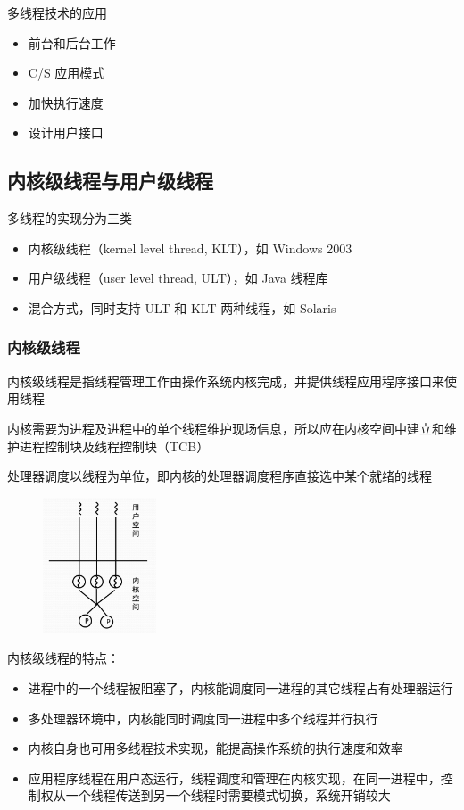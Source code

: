 \documentclass[cs4size,a4paper,10pt]{ctexart}
\begin{document}
	多线程技术的应用
	\begin{itemize}
		\item 前台和后台工作
		\item C/S 应用模式
		\item 加快执行速度
		\item 设计用户接口
	\end{itemize}


	\subsection{内核级线程与用户级线程}
	多线程的实现分为三类
	\begin{itemize}
		\item 内核级线程（kernel level thread, KLT），如 Windows 2003
		\item 用户级线程（user level thread, ULT），如 Java 线程库
		\item 混合方式，同时支持 ULT 和 KLT 两种线程，如 Solaris
	\end{itemize}

	\subsubsection{内核级线程}
	内核级线程是指线程管理工作由操作系统内核完成，并提供线程应用程序接口来使用线程

	内核需要为进程及进程中的单个线程维护现场信息，所以应在内核空间中建立和维护进程控制块及线程控制块（TCB）

	处理器调度以线程为单位，即内核的处理器调度程序直接选中某个就绪的线程

	\begin{figure}[H]
		\centering
		\includegraphics[width=0.3\textwidth]{img/2.4.2.1}
	\end{figure}

	内核级线程的特点：
	\begin{itemize}
		\item 进程中的一个线程被阻塞了，内核能调度同一进程的其它线程占有处理器运行
		\item 多处理器环境中，内核能同时调度同一进程中多个线程并行执行
		\item 内核自身也可用多线程技术实现，能提高操作系统的执行速度和效率
		\item 应用程序线程在用户态运行，线程调度和管理在内核实现，在同一进程中，控制权从一个线程传送到另一个线程时需要模式切换，系统开销较大
	\end{itemize}
\end{document}
